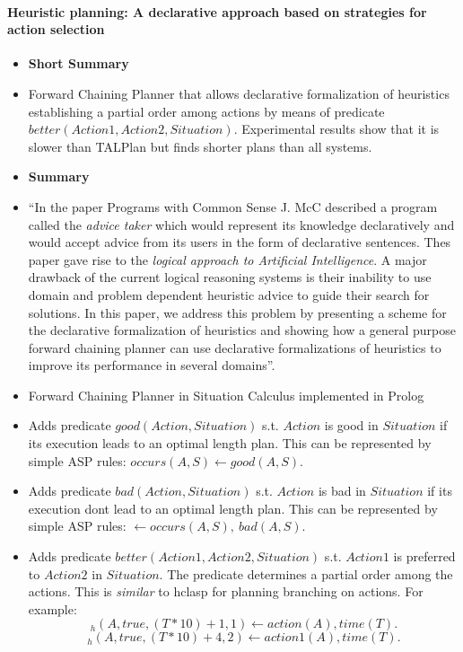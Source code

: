 \paragraph{Heuristic planning: A declarative approach based on strategies for action selection \cite{sierra04a}}
\begin{itemize}
  \item \textbf{Short Summary}
  \item Forward Chaining Planner that allows declarative formalization of heuristics
        establishing a partial order among actions by means of predicate $better(Action1,Action2,Situation)$.
        Experimental results show that it is slower than TALPlan but finds shorter plans than all systems.
  \item \textbf{Summary}
  \item ``In the paper Programs with Common Sense J. McC described a program called the \textit{advice taker}
        which would represent its knowledge declaratively and would accept advice from its users in the form 
        of declarative sentences. Thes paper gave rise to the \textit{logical approach to Artificial Intelligence}.
        A major drawback of the current logical reasoning systems is their inability to use domain and problem
        dependent heuristic advice to guide their search for solutions. In this paper, we address this problem by presenting
        a scheme for the declarative formalization of heuristics and showing how a general purpose forward chaining 
        planner can use declarative formalizations of heuristics to improve its performance in several domains''.
  \item Forward Chaining Planner in Situation Calculus implemented in Prolog 
  \item Adds predicate $good(Action,Situation)$ s.t. $Action$ is good in $Situation$ if its execution leads to an 
        optimal length plan. This can be represented by simple ASP rules: $occurs(A,S) \leftarrow good(A,S)$.
  \item Adds predicate $bad(Action,Situation)$ s.t. $Action$ is bad in $Situation$ if its execution dont lead to an 
        optimal length plan. This can be represented by simple ASP rules: $\leftarrow occurs(A,S), \ bad(A,S)$.
  \item Adds predicate $better(Action1,Action2,Situation)$ s.t. $Action1$ is preferred to $Action2$ in $Situation$. 
        The predicate determines a partial order among the actions. This is \textit{similar} to hclasp for planning branching on actions.
        For example: \[ _h(A,true,(T*10) + 1,1) \leftarrow action(A), time(T). \] \[ _h(A,true,(T*10)+4,2) \leftarrow action1(A), time(T). \]

\end{itemize}
